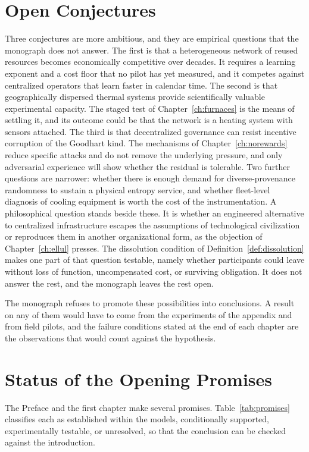 \section{Open Conjectures}

Three conjectures are more ambitious, and they are empirical questions that the monograph does not answer. The first is that a heterogeneous network of reused resources becomes economically competitive over decades. It requires a learning exponent and a cost floor that no pilot has yet measured, and it competes against centralized operators that learn faster in calendar time. The second is that geographically dispersed thermal systems provide scientifically valuable experimental capacity. The staged test of Chapter~\ref{ch:furnaces} is the means of settling it, and its outcome could be that the network is a heating system with sensors attached. The third is that decentralized governance can resist incentive corruption of the Goodhart kind. The mechanisms of Chapter~\ref{ch:norewards} reduce specific attacks and do not remove the underlying pressure, and only adversarial experience will show whether the residual is tolerable. Two further questions are narrower: whether there is enough demand for diverse-provenance randomness to sustain a physical entropy service, and whether fleet-level diagnosis of cooling equipment is worth the cost of the instrumentation. A philosophical question stands beside these. It is whether an engineered alternative to centralized infrastructure escapes the assumptions of technological civilization or reproduces them in another organizational form, as the objection of Chapter~\ref{ch:ellul} presses. The dissolution condition of Definition~\ref{def:dissolution} makes one part of that question testable, namely whether participants could leave without loss of function, uncompensated cost, or surviving obligation. It does not answer the rest, and the monograph leaves the rest open.

The monograph refuses to promote these possibilities into conclusions. A result on any of them would have to come from the experiments of the appendix and from field pilots, and the failure conditions stated at the end of each chapter are the observations that would count against the hypothesis.

\section{Status of the Opening Promises}

The Preface and the first chapter make several promises. Table~\ref{tab:promises} classifies each as established within the models, conditionally supported, experimentally testable, or unresolved, so that the conclusion can be checked against the introduction.

